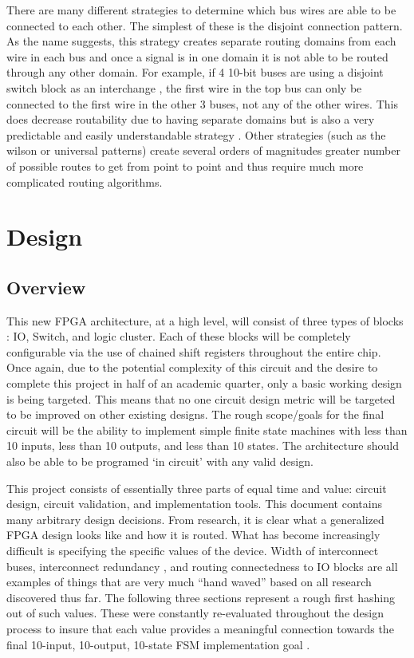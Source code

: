 \documentclass[12pt]{article}
\begin{document}
There are many different strategies to determine which bus wires are able to be connected 
to each other. The simplest of these is the disjoint connection pattern. As the name 
suggests, this strategy creates separate routing domains from each wire in each bus 
and once a signal is in one domain it is not able to be routed through any other 
domain. For example, if 4 10-bit buses are using a disjoint switch block as an interchange
, the first wire in the top bus can only be connected to the first wire in the other 
3 buses, not any of the other wires. This does decrease routability due to having 
separate domains but is also a very predictable and easily understandable strategy
. Other strategies (such as the wilson or universal patterns) create several orders 
of magnitudes greater number of possible routes to get from point to point and thus 
require much more complicated routing algorithms.

\section{Design}

\subsection{Overview}
This new FPGA architecture, at a high level, will consist of three types of blocks
: IO, Switch, and logic cluster. Each of these blocks will be completely configurable 
via the use of chained shift registers throughout the entire chip. Once again, due 
to the potential complexity of this circuit and the desire to complete this project 
in half of an academic quarter, only a basic working design is being targeted. This 
means that no one circuit design metric will be targeted to be improved on other 
existing designs. The rough scope/goals for the final circuit will be the ability 
to implement simple finite state machines with less than 10 inputs, less than 10 
outputs, and less than 10 states. The architecture should also be able to be programed 
‘in circuit’ with any valid design.


This project consists of essentially three parts of equal time and value: circuit 
design, circuit validation, and implementation tools. This document contains many 
arbitrary design decisions. From research, it is clear what a generalized FPGA design 
looks like and how it is routed. What has become increasingly difficult is specifying 
the specific values of the device. Width of interconnect buses, interconnect redundancy
, and routing connectedness to IO blocks are all examples of things that are very 
much “hand waved” based on all research discovered thus far. The following three 
sections represent a rough first hashing out of such values. These were constantly 
re-evaluated throughout the design process to insure that each value provides a meaningful 
connection towards the final 10-input, 10-output, 10-state FSM implementation goal
.
\end{document}
